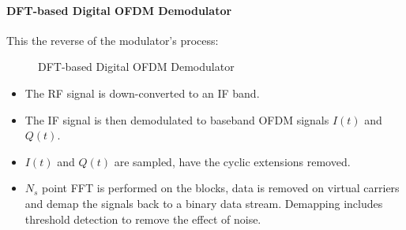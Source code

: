 \paragraph{\gls{DFT}-based Digital OFDM Demodulator}
This the reverse of the modulator's process:
\begin{figure}[h!]
	\centerline{\resizebox{16cm}{!}{}}
	\caption{DFT-based Digital OFDM Demodulator}
	\label{fig:dft_demod}
\end{figure}
\begin{itemize}
	\item The RF signal is down-converted to an \gls{IF} band.
	\item The \gls{IF} signal is then demodulated to baseband OFDM signals $I(t)$ and $Q(t)$.
	\item $I(t)$ and $Q(t)$ are sampled, have the cyclic extensions removed.
	\item $N_s$ point \gls{FFT} is performed on the blocks, data is removed on virtual carriers and demap the signals back to a binary data stream. Demapping includes threshold detection to remove the effect of noise.
\end{itemize}
\pagebreak
